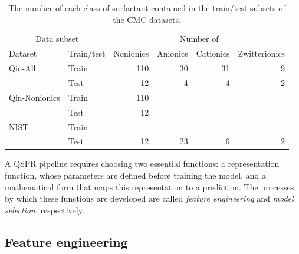 \begin{table}
    \centering
    \caption{The number of each class of surfactant contained in the train/test subsets of the CMC datasets.}
    \label{tab:data-split}
    \begin{tabular}{@{}llrrrr@{}} \toprule \multicolumn{2}{c}{Data subset} & \multicolumn{4}{c}{Number of}                                                    \\\cmidrule(r){1-2}\cmidrule(l){3-6}
               Dataset                                                 & Train/test                    & Nonionics & Anionics & Cationics & Zwitterionics \\\midrule
               Qin-All                                                 & Train                         & 110       & 30       & 31        & 9             \\
                                                                       & Test                          & 12        & 4        & 4         & 2             \\
               Qin-Nonionics                                           & Train                         & 110       &          &           &               \\
                                                                       & Test                          & 12        &          &           &               \\
               NIST                                                    & Train                         &           &          &           &               \\
                                                                       & Test                          & 12        & 23       & 6         & 2             \\\bottomrule
    \end{tabular}
\end{table}

A QSPR pipeline requires choosing two essential functions: a representation
function, whose parameters are defined before training the model, and a
mathematical form that maps this representation to a prediction. The processes
by which these functions are developed are called \emph{feature engineering} and
\emph{model selection}, respectively.

\subsection{Feature engineering}

